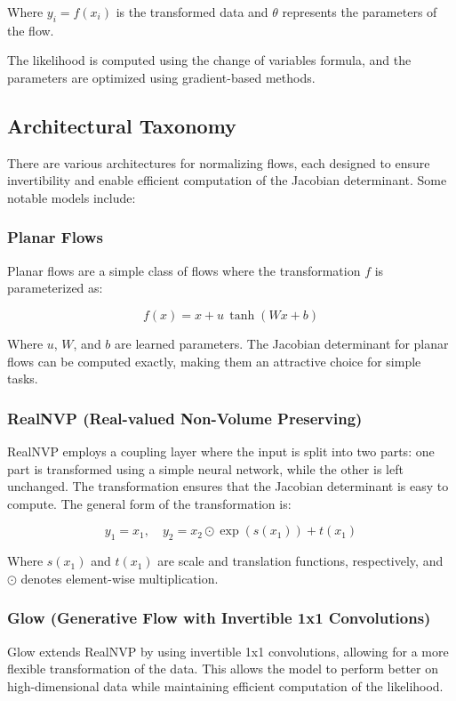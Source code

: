 \documentclass{article}
\begin{document}
Where \( y_i = f(x_i) \) is the transformed data and \( \theta \) represents the parameters of the flow.

The likelihood is computed using the change of variables formula, and the parameters are optimized using gradient-based methods.

\subsection{Architectural Taxonomy}
There are various architectures for normalizing flows, each designed to ensure invertibility and enable efficient computation of the Jacobian determinant. Some notable models include:

\subsubsection{Planar Flows}
Planar flows are a simple class of flows where the transformation \( f \) is parameterized as:

\[
f(x) = x + u \, \tanh(Wx + b)
\]

Where \( u \), \( W \), and \( b \) are learned parameters. The Jacobian determinant for planar flows can be computed exactly, making them an attractive choice for simple tasks.

\subsubsection{RealNVP (Real-valued Non-Volume Preserving)}
RealNVP employs a coupling layer where the input is split into two parts: one part is transformed using a simple neural network, while the other is left unchanged. The transformation ensures that the Jacobian determinant is easy to compute. The general form of the transformation is:

\[
y_1 = x_1, \quad y_2 = x_2 \odot \exp(s(x_1)) + t(x_1)
\]

Where \( s(x_1) \) and \( t(x_1) \) are scale and translation functions, respectively, and \( \odot \) denotes element-wise multiplication.

\subsubsection{Glow (Generative Flow with Invertible 1x1 Convolutions)}
Glow extends RealNVP by using invertible 1x1 convolutions, allowing for a more flexible transformation of the data. This allows the model to perform better on high-dimensional data while maintaining efficient computation of the likelihood.
\end{document}
